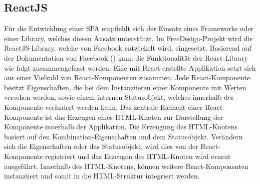 \subsection{ReactJS}
Für die Entwicklung einer SPA empfiehlt sich der Einsatz eines Frameworks oder einer Library, welches diesen Ansatz unterstützt. Im FreeDesign-Projekt wird die ReactJS-Library, welche von Facebook entwickelt wird, eingesetzt.
Basierend auf der Dokumentation von Facebook (\cite{Facebook:React}) kann die Funktionalität der React-Library wie folgt zusammengefasst werden.
Eine mit React erstellte Applikation setzt sich aus einer Vielzahl von React-Komponenten zusammen. Jede React-Komponente besitzt Eigenschaften, die bei dem Instanziieren einer Komponente mit Werten versehen werden, sowie einem internen Statusobjekt, welches innerhalb der Komponente verändert werden kann. 
Das zentrale Element einer React-Komponente ist das Erzeugen eines HTML-Knoten zur Darstellung der Komponente innerhalb der Applikation. Die Erzeugung des HTML-Knotens basiert auf den Kombination-Eigenschaften und dem Statusobjekt.
Verändern sich die Eigenschaften oder das Statusobjekt, wird dies von der React-Komponente registriert und das Erzeugen des HTML-Knoten wird erneut ausgeführt. Innerhalb des HTML-Knotens, können weitere React-Komponenten instanziiert und somit in die HTML-Struktur integriert werden.

